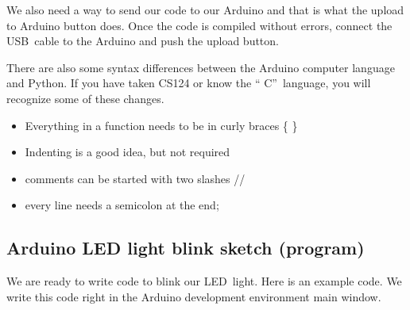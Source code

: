 We also need a way to send our code to our Arduino and that is what the
upload to Arduino button does. Once the code is compiled without errors,
connect the USB\ cable to the Arduino and push the upload button.

There are also some syntax differences between the Arduino computer language
and Python. If you have taken CS124 or know the \textquotedblleft
C\textquotedblright\ language, you will recognize some of these changes.

\begin{itemize}
\item Everything in a function needs to be in curly braces \{ \}

\item Indenting is a good idea, but not required

\item comments can be started with two slashes //

\item every line needs a semicolon at the end;
\end{itemize}

\subsection{Arduino LED light blink sketch (program)}

We are ready to write code to blink our LED\ light. Here is an example code.
We write this code right in the Arduino development environment main window.





% 
% 
% 
% 
% 
% 

